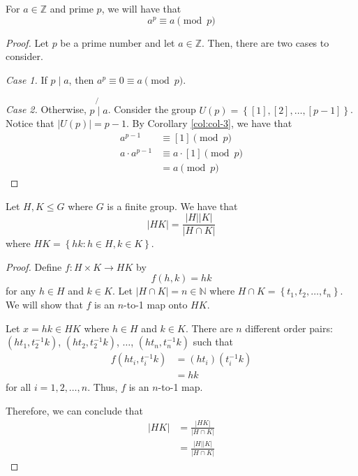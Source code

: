 \begin{theorem}
    For \(a \in \mathbb{Z}\) and prime \(p\), we will have that
    \[
        a^p \equiv a \pmod p
    \]
\end{theorem}

\begin{proof}
    Let \(p\) be a prime number and let \(a \in \mathbb{Z}\). Then, there are two cases to consider.

    \textit{Case 1.} If \(p \mid a\), then \(a^p \equiv 0 \equiv a \pmod p\).

    \textit{Case 2.} Otherwise, \(p \not{\mid} a\). Consider the group \(U(p) = \left\{[1], [2], \ldots, [p-1]\right\}\). Notice that \(|U(p)| = p-1\). By Corollary \ref{col:col-3}, we have that
    \[
    \begin{aligned}
        a^{p-1} &\equiv [1] \pmod p \\
        a \cdot a^{p-1} &\equiv a \cdot [1] \pmod p \\
                        &= a \pmod p
    \end{aligned}
    \]
\end{proof}

\begin{theorem}
    Let \(H, K \leq G\) where \(G\) is a finite group. We have that
    \[
        |HK| = \frac{|H||K|}{|H \cap K|}
    \]
    where \(HK = \left\{hk : h \in H, k \in K\right\}\).
\end{theorem}

\begin{proof}
    Define \(f : H \times K \to HK\) by
    \[
        f(h, k) = hk
    \]
    for any \(h \in H\) and \(k \in K\). Let \(|H \cap K| = n \in \mathbb{N}\) where \(H \cap K = \left\{t_1, t_2, \ldots, t_n\right\}\). We will show that \(f\) is an \(n\)-to-1 map onto \(HK\).

    Let \(x = hk \in HK\) where \(h \in H\) and \(k \in K\). There are \(n\) different order pairs: \((ht_1, t_2^{-1}k)\), \((ht_2, t_2^{-1}k)\), \(\ldots\), \((ht_n, t_n^{-1}k)\) such that
    \[
    \begin{aligned}
        f(ht_i, t_i^{-1}k) &= (ht_i)(t_i^{-1}k) \\
                           &= hk
    \end{aligned}
    \]
    for all \(i = 1, 2, \ldots, n\). Thus, \(f\) is an \(n\)-to-1 map.

    Therefore, we can conclude that
    \[
    \begin{aligned}
        |HK| &= \frac{|HK|}{|H \cap K|} \\
             &= \frac{|H||K|}{|H \cap K|}
    \end{aligned}
    \]
\end{proof}

